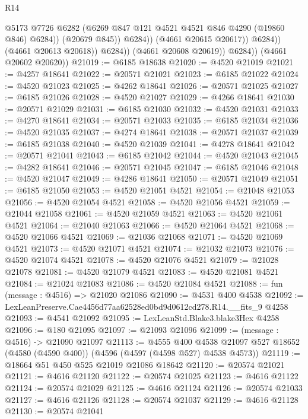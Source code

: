 \begin{lexlean}{R14}
\begin{coremodule}
                                @5173
                                @7726
                                @6282
                                (@6269 @847 @121 @4521 @4521 @846 @4290 (@19860 @846) @6284))
                              (@20679 @845))
                            @6284))
                        (@4661 @20615 @20617))
                      @6284))
                  (@4661 @20613 @20618))
                @6284))
            (@4661 @20608 @20619))
          @6284))
      (@4661 @20602 @20620))
@21019 := @6185 @18638
@21020 := @4520 @21019
@21021 := @4257 @18641
@21022 := @20571 @21021
@21023 := @6185 @21022
@21024 := @4520 @21023
@21025 := @4262 @18641
@21026 := @20571 @21025
@21027 := @6185 @21026
@21028 := @4520 @21027
@21029 := @4266 @18641
@21030 := @20571 @21029
@21031 := @6185 @21030
@21032 := @4520 @21031
@21033 := @4270 @18641
@21034 := @20571 @21033
@21035 := @6185 @21034
@21036 := @4520 @21035
@21037 := @4274 @18641
@21038 := @20571 @21037
@21039 := @6185 @21038
@21040 := @4520 @21039
@21041 := @4278 @18641
@21042 := @20571 @21041
@21043 := @6185 @21042
@21044 := @4520 @21043
@21045 := @4282 @18641
@21046 := @20571 @21045
@21047 := @6185 @21046
@21048 := @4520 @21047
@21049 := @4286 @18641
@21050 := @20571 @21049
@21051 := @6185 @21050
@21053 := @4520 @21051 @4521
@21054 := @21048 @21053
@21056 := @4520 @21054 @4521
@21058 := @4520 @21056 @4521
@21059 := @21044 @21058
@21061 := @4520 @21059 @4521
@21063 := @4520 @21061 @4521
@21064 := @21040 @21063
@21066 := @4520 @21064 @4521
@21068 := @4520 @21066 @4521
@21069 := @21036 @21068
@21071 := @4520 @21069 @4521
@21073 := @4520 @21071 @4521
@21074 := @21032 @21073
@21076 := @4520 @21074 @4521
@21078 := @4520 @21076 @4521
@21079 := @21028 @21078
@21081 := @4520 @21079 @4521
@21083 := @4520 @21081 @4521
@21084 := @21024 @21083
@21086 := @4520 @21084 @4521
@21088 := fun (message : @4516) => @21020 @21086
@21090 := @4531 @400 @4538
@21092 := LexLeanPreserve.Cae4456d77aa62528ed0bd9d0612cd278.R14.__fits_9 @4258
@21093 := @4541 @21092
@21095 := LexLeanStd.Blake3.blake3Hex @4258
@21096 := @180 @21095
@21097 := @21093 @21096
@21099 := (message : @4516) -> @21090 @21097
@21113 := @4555
    @400
    @4538
    @21097
    @527
    @18652
    (@4580 (@4590 @400))
    (@4596 (@4597 (@4598 @527) @4538 @4573))
@21119 := @18664 @51 @450 @525 @21019 @21086 @18642
@21120 := @20574 @21021
@21121 := @4616 @21120
@21122 := @20574 @21025
@21123 := @4616 @21122
@21124 := @20574 @21029
@21125 := @4616 @21124
@21126 := @20574 @21033
@21127 := @4616 @21126
@21128 := @20574 @21037
@21129 := @4616 @21128
@21130 := @20574 @21041

\end{coremodule}
\end{lexlean}

